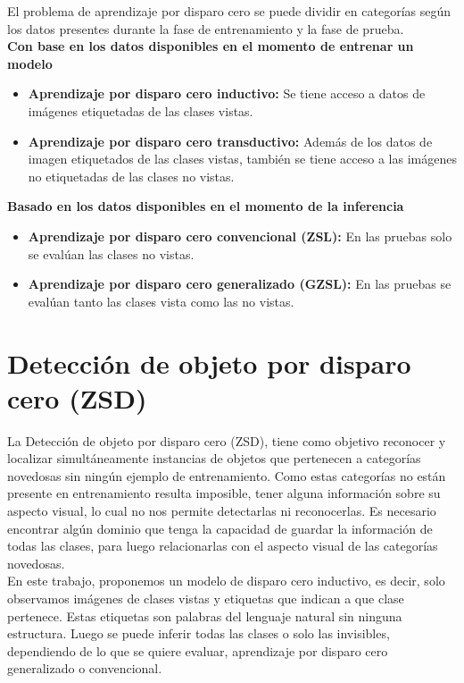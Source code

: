 El problema de aprendizaje por disparo cero se puede dividir en categorías según los datos presentes durante la fase de entrenamiento y la fase de prueba.\\
\textbf{Con base en los datos disponibles en el momento de entrenar un modelo}
\begin{itemize}
	\item \textbf{Aprendizaje por disparo cero inductivo:} Se tiene acceso a datos de imágenes etiquetadas de las clases vistas.
	\item \textbf{Aprendizaje por disparo cero transductivo:} Además de los datos de imagen etiquetados de las clases vistas, también se tiene acceso a las imágenes no etiquetadas de las clases no vistas.
\end{itemize}
\textbf{Basado en los datos disponibles en el momento de la inferencia}
\begin{itemize}
	\item \textbf{Aprendizaje por disparo cero convencional (ZSL):} En las pruebas solo se evalúan las clases no vistas.
	\item \textbf{Aprendizaje por disparo cero generalizado (GZSL):} En las pruebas se evalúan tanto las clases vista como las no vistas.
\end{itemize}


\section {Detección de objeto por disparo cero (ZSD)}\label{cap:ZSD}
La Detección de objeto por disparo cero (ZSD), tiene como objetivo reconocer y localizar simultáneamente instancias de objetos que pertenecen a categorías novedosas sin ningún ejemplo de entrenamiento. Como estas categorías no están presente en entrenamiento resulta imposible, tener alguna información sobre su aspecto visual, lo cual no nos permite detectarlas ni reconocerlas. Es necesario encontrar algún dominio que tenga la capacidad de guardar la información de todas las clases, para luego relacionarlas con el aspecto visual de las categorías novedosas. \\

En este trabajo, proponemos un modelo de disparo cero inductivo, es decir, solo observamos imágenes de clases vistas y etiquetas que indican a que clase pertenece. Estas etiquetas son palabras del lenguaje natural sin ninguna estructura. Luego se puede inferir todas las clases o solo las invisibles, dependiendo de lo que se quiere evaluar, aprendizaje por disparo cero generalizado o convencional.\\ 


